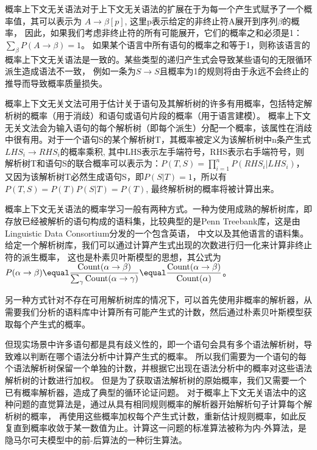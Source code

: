 概率上下文无关语法对于上下文无关语法的扩展在于为每一个产生式赋予了一个概率值，其可以表示为 $\displaystyle A \rightarrow \beta [p]$, 这里p表示给定的非终止符A展开到序列$\beta$的概率，
因此，如果我们考虑非终止符的所有可能展开，它们的概率之和必须是1：$\displaystyle \sum_\beta P(A \rightarrow \beta) \equal 1$。
如果某个语言中所有语句的概率之和等于1，则称该语言的概率上下文无关语法是一致的。某些类型的递归产生式会导致某些语句的无限循环派生造成语法不一致，
例如一条为$\displaystyle S \rightarrow S$且概率为1的规则将由于永远不会终止的推导而导致概率质量损失\cite{1672339}。

概率上下文无关文法可用于估计关于语句及其解析树的许多有用概率，包括特定解析树的概率（用于消歧）和语句或语句片段的概率（用于语言建模）。
概率上下文无关文法会为输入语句的每个解析树（即每个派生）分配一个概率，该属性在消歧中很有用。对于一个语句S的某个解析树T，其概率被定义为该解析树中n条产生式$\displaystyle LHS_i \rightarrow RHS_i$的概率乘积,
其中LHS表示左手端符号，RHS表示右手端符号，则解析树T和语句S的联合概率可以表示为：$\displaystyle P(T, S) = \prod_{i \equal 1}^{n} P(RHS_i|LHS_i)$，
又因为该解析树T必然生成语句S，即$\displaystyle P(S|T) \equal 1$，所以有$\displaystyle P(T, S) \equal P(T)P(S|T) \equal P(T)$, 最终解析树的概率将被计算出来。

概率上下文无关语法的概率学习一般有两种方式。一种为使用成熟的解析树库，即存放已经被解析的语句构成的语料集，比较典型的是Penn Treebank库，这是由Linguistic Data Consortium分发的一个包含英语，
中文以及其他语言的语料集\cite{Penn-Treebank}。给定一个解析树库，我们可以通过计算产生式出现的次数进行归一化来计算非终止符的派生概率，
这也是朴素贝叶斯模型的思想，其公式为$\displaystyle P(\alpha \rightarrow \beta) \equal \frac{\textup{Count}(\alpha \rightarrow \beta)}{\sum_{\gamma}\textup{Count}(\alpha \rightarrow \gamma)} \equal \frac{\textup{Count}(\alpha \rightarrow \beta)}{\textup{Count}(\alpha)}$。

另一种方式针对不存在可用解析树库的情况下，可以首先使用非概率的解析器，从需要我们分析的语料库中计算所有可能产生式的计数，然后通过朴素贝叶斯模型获取每个产生式的概率。

但现实场景中许多语句都是具有歧义性的，即一个语句会具有多个语法解析树，导致难以判断在哪个语法分析中计算产生式的概率。
所以我们需要为一个语句的每个语法解析树保留一个单独的计数，并根据它出现在语法分析中的概率对这些语法解析树的计数进行加权。
但是为了获取语法解析树的原始概率，我们又需要一个已有概率解析器，造成了典型的循环论证问题。
对于概率上下文无关语法中的这种问题的直觉算法是，通过从具有相同规则概率的解析器开始解析句子计算每个解析树的概率，
再使用这些概率加权每个产生式计数，重新估计规则概率，如此反复直到概率收敛于某一数值为止。计算这一问题的标准算法被称为内-外算法，是隐马尔可夫模型中的前-后算法的一种衍生算法\cite{1979Trainable}。

